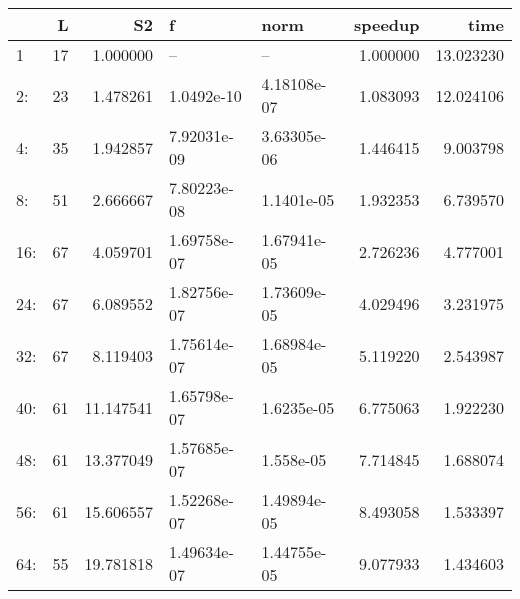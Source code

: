 \begin{tabular}{lrrllrr}
\toprule
{} &   L &         S2 &            f &         norm &   speedup &       time \\
\midrule
1   &  17 &   1.000000 &           -- &           -- &  1.000000 &  13.023230 \\
2:  &  23 &   1.478261 &   1.0492e-10 &  4.18108e-07 &  1.083093 &  12.024106 \\
4:  &  35 &   1.942857 &  7.92031e-09 &  3.63305e-06 &  1.446415 &   9.003798 \\
8:  &  51 &   2.666667 &  7.80223e-08 &   1.1401e-05 &  1.932353 &   6.739570 \\
16: &  67 &   4.059701 &  1.69758e-07 &  1.67941e-05 &  2.726236 &   4.777001 \\
24: &  67 &   6.089552 &  1.82756e-07 &  1.73609e-05 &  4.029496 &   3.231975 \\
32: &  67 &   8.119403 &  1.75614e-07 &  1.68984e-05 &  5.119220 &   2.543987 \\
40: &  61 &  11.147541 &  1.65798e-07 &   1.6235e-05 &  6.775063 &   1.922230 \\
48: &  61 &  13.377049 &  1.57685e-07 &    1.558e-05 &  7.714845 &   1.688074 \\
56: &  61 &  15.606557 &  1.52268e-07 &  1.49894e-05 &  8.493058 &   1.533397 \\
64: &  55 &  19.781818 &  1.49634e-07 &  1.44755e-05 &  9.077933 &   1.434603 \\
\bottomrule
\end{tabular}
